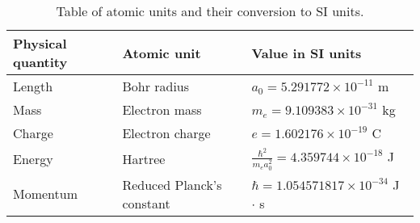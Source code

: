 \begin{table}[]
\begin{tabular}{@{}lll@{}}
\toprule
Physical quantity & Atomic unit               & Value in SI units                                           \\ \midrule
Length            & Bohr radius               & $a_0 = 5.291772 \times 10^{-11}$ m                       \\
Mass              & Electron mass             & $m_e = 9.109383 \times 10^{-31}$ kg                      \\
Charge            & Electron charge           & $e = 1.602176 \times 10^{-19}$ C                         \\
Energy            & Hartree                   & $\frac{\hbar^2}{m_e a_0^2} = 4.359744 \times 10^{-18}$ J \\
Momentum          & Reduced Planck's constant & $\hbar = 1.054571817 \times 10^{-34}$ J $\cdot$ s           \\ \bottomrule
\end{tabular}
\caption{Table of atomic units and their conversion to SI units.}
\label{t:atomic}
\end{table}
